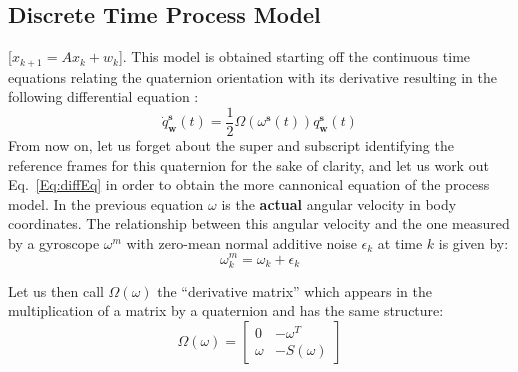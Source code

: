\documentclass[a4paper,10pt]{article}
\DeclareMathOperator{\sensor}{\mathbf{s}}
\DeclareMathOperator{\world}{\mathbf{w}}
\begin{document}
\subsection{\textbf{Discrete Time Process Model}} 
[$x_{k+1} = Ax_k + w_k$]. This model is obtained starting off the continuous time equations relating the quaternion orientation with its derivative resulting in the following differential equation \cite{Trawny2005}: 
 \begin{equation}
  \dot{q}^{\sensor}_{\world}(t) = \frac{1}{2}\Omega(\omega^{\sensor}(t))q^{\sensor}_{\world}(t)
  \label{Eq:diffEq}
 \end{equation}
 From now on, let us forget about the super and subscript identifying the reference frames for this quaternion for the sake of clarity, and let us work out Eq.~\ref{Eq:diffEq} in order to obtain the more cannonical equation of the process model. In the previous equation $\omega$ is the \textbf{actual} angular velocity in body coordinates. The relationship between this angular velocity and the one measured by a gyroscope $\omega^m$ with zero-mean normal additive noise $\epsilon_k$ at time $k$ is given by:
  \begin{equation}
   \omega^m_k = \omega_k + \epsilon_k
  \end{equation} 
  
  Let us then call $\Omega(\omega)$ the ``derivative matrix'' which appears in the multiplication of a matrix by a quaternion and has the same structure:
  \begin{equation}
  \Omega(\omega)=
     \left[\begin{array}{cc}
         0      & -\omega^T  \\
       \omega   & -S(\omega)
    \end{array}  \right]
  \end{equation}
\end{document}
